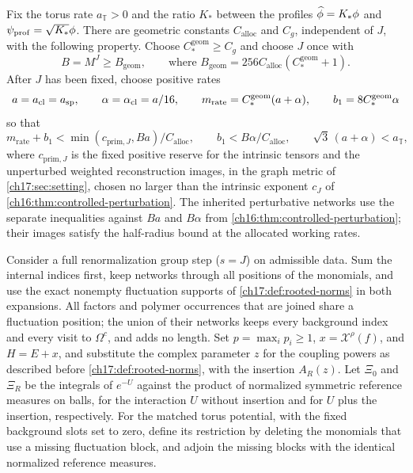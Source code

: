 \begin{theorem}\label{ch17:thm:carried-networks}
Fix the torus rate $a_{\mathbb T}>0$ and the ratio $K_*$ between the profiles $\widehat\phi=K_*\phi$ and $\psi_{\mathrm{prof}}=\sqrt{K_*}\phi$. There are geometric constants $C_{\mathrm{alloc}}$ and $C_g$, independent of $J$, with the following property. Choose $C_*^{\mathrm{geom}}\ge C_g$ and choose $J$ once with
\[
 B=M^J\ge B_{\mathrm{geom}},\qquad\text{where }B_{\mathrm{geom}}=256C_{\mathrm{alloc}}(C_*^{\mathrm{geom}}+1).
\]
After $J$ has been fixed, choose positive rates
\[
 a=a_{\mathrm{cl}}=a_{\mathrm{sp}},\qquad\alpha=\alpha_{\mathrm{cl}}=a/16,\qquad m_{\mathrm{rate}}=C_*^{\mathrm{geom}}(a+\alpha),\qquad b_1=8C_*^{\mathrm{geom}}\alpha
\]
so that
\[
 m_{\mathrm{rate}}+b_1<\min(c_{\mathrm{prim},J},Ba)/C_{\mathrm{alloc}},\qquad b_1<B\alpha/C_{\mathrm{alloc}},\qquad \sqrt3\,(a+\alpha)<a_{\mathbb T},
\]
where $c_{\mathrm{prim},J}$ is the fixed positive reserve for the intrinsic tensors and the unperturbed weighted reconstruction images, in the graph metric of \cref{ch17:sec:setting}, chosen no larger than the intrinsic exponent $c_J$ of \cref{ch16:thm:controlled-perturbation}. The inherited perturbative networks use the separate inequalities against $Ba$ and $B\alpha$ from \cref{ch16:thm:controlled-perturbation}; their images satisfy the half-radius bound at the allocated working rates.

Consider a full renormalization group step ($s=J$) on admissible data. Sum the internal indices first, keep networks through all positions of the monomials, and use the exact nonempty fluctuation supports of \cref{ch17:def:rooted-norms} in both expansions. All factors and polymer occurrences that are joined share a fluctuation position; the union of their networks keeps every background index and every visit to $\Omega^c$, and adds no length. Set $p=\max_ip_i\ge1$, $x=\mathcal X^\rho(f)$, and $H=E+x$, and substitute the complex parameter $z$ for the coupling powers as described before \cref{ch17:def:rooted-norms}, with the insertion $A_R(z)$. Let $\Xi_0$ and $\Xi_R$ be the integrals of $e^{-U}$ against the product of normalized symmetric reference measures on balls, for the interaction $U$ without insertion and for $U$ plus the insertion, respectively. For the matched torus potential, with the fixed background slots set to zero, define its restriction by deleting the monomials that use a missing fluctuation block, and adjoin the missing blocks with the identical normalized reference measures.


\end{theorem}
